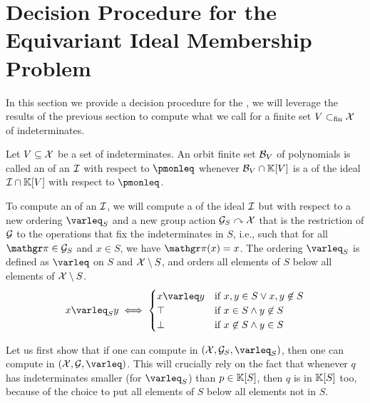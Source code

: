 %
\section{Decision Procedure for the Equivariant Ideal Membership Problem}
\label{sec:algorithm}

In this section we provide a decision procedure for the , we will leverage the results of the previous section
to compute what we call  for a finite set
$V \subset_{\text{fin}} \mathcal{X}$ of indeterminates.

\begin{definition}
  \label{def:strong-equiv-grob}
  Let $V \subseteq \mathcal{X}$ be a set of indeterminates.
  An orbit finite set $\Basis_V$
  of polynomials is called an 
  of an  $\idl$ with respect to $\pmonleq$
  whenever $\Basis_V \cap \poly{\K}{V}$ is a
   of the ideal $\idl \cap \poly{\K}{V}$ with respect to
  $\pmonleq$.
\end{definition}

\AP To compute an  of an
 $\idl$, we will compute a  of the ideal $\idl$ but with respect to a new ordering $\varleq_S$ and a
new group action $\mathcal{G}_S \curvearrowright \mathcal{X}$ that is the restriction of $\mathcal{G}$ to
the operations that fix the indeterminates in $S$, i.e., such that for all
$\gelem \in \group_S$ and $x \in S$, we have $\gelem(x) = x$. The ordering
$\varleq_S$ is defined as $\varleq$ on $S$ and $\mathcal{X} \setminus S$, and orders all
elements of $S$ below all elements of $\mathcal{X} \setminus S$.
\begin{equation}
  \label{eq:order-S}
  x \varleq_S y \iff
  \begin{cases}
    x \varleq y & \text{if } x,y \in S \lor x,y \not\in S  \\
    \top        & \text{if } x \in S \land y \not\in S \\
    \bot        & \text{if } x \not\in S \land y \in S
  \end{cases}
\end{equation}

\AP Let us first show that if one can compute  in $(\X, \group_S, \varleq_S)$, then one can compute  in $(\X, \group, \varleq)$. This will crucially rely
on the fact that whenever $q$ has indeterminates smaller (for $\varleq_S$) than
$p \in \mathbb{K}[S]$, then $q$ is in $\mathbb{K}[S]$ too, because of the choice
to put all elements of $S$ below all elements not in $S$.

